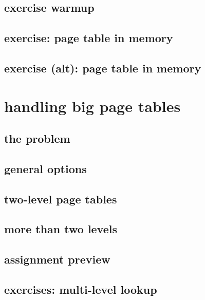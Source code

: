 \subsection{exercise warmup}

\subsection{exercise: page table in memory}

\subsection{exercise (alt): page table in memory}


\section{handling big page tables}
\subsection{the problem}


\subsection{general options}


\subsection{two-level page tables}



\subsection{more than two levels}


\subsection{assignment preview}

\subsection{exercises: multi-level lookup}
